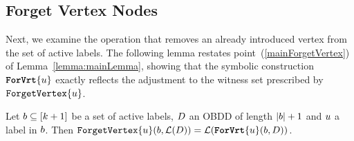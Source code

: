 \subsection{Forget Vertex Nodes}

Next, we examine the operation that removes an already introduced vertex from the set of active labels. The following lemma restates point~(\ref{mainForgetVertex}) of Lemma~\ref{lemma:mainLemma}, showing that the symbolic construction $\texttt{\textbf{ForVrt}}\{u\}$ exactly reflects the adjustment to the witness set prescribed by $\texttt{ForgetVertex}\{u\}$.

\begin{lemma}
\label{lemma:SymbolicForgetVertexAppendix}
Let $b \subseteq [k+1]$ be a set of active labels, $D$ an OBDD of length $|b|+1$ and $u$ a label in $b$. Then  $\texttt{ForgetVertex}\{u\}(b, \mathcal{L}(D))  = \mathcal{L}(\texttt{\textbf{ForVrt}}\{u\}(b, D))$.
\end{lemma}


